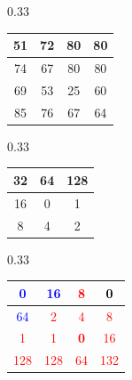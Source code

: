 \begin{subtable}{0.33\textwidth}
    \centering
    \begin{tabular}{|c|c|c|c|}
        \hline
        51 & 72 & 80 & 80 \\ \hline
        74 & 67 & 80 & 80 \\ \hline
        69 & 53 & 25 & 60 \\ \hline
        85 & 76 & 67 & 64 \\ \hline
    \end{tabular}
    \caption{Elevation Surface}\label{tab:ele_surface}
\end{subtable}%
\begin{subtable}{0.33\textwidth}
    \centering
    \begin{tabular}{|c|c|c|}
        \hline
        32 & 64 & 128 \\ \hline
        16 & 0 & 1 \\ \hline
        8 & 4 & 2 \\  \hline
    \end{tabular}
    \vspace{0.3cm}
    \caption{Direction Coding Matrix}\label{tab:direction}
\end{subtable}%
\begin{subtable}{0.33\textwidth}
    \centering
    \begin{tabular}{|c|c|c|c|}
        \hline
        \textcolor{blue}{\textbf{0}} & \textcolor{blue}{16} &     \textcolor{red}{8}      & \textcolor{black}{\textbf{0}} \\ \hline
        \textcolor{blue}{64}     &  \textcolor{red}{2}  &     \textcolor{red}{4}      &      \textcolor{red}{8}       \\ \hline
        \textcolor{red}{1}      &  \textcolor{red}{1}  & \textcolor{red}{\textbf{0}} &      \textcolor{red}{16}      \\ \hline
        \textcolor{red}{128}     & \textcolor{red}{128} &     \textcolor{red}{64}     &     \textcolor{red}{132}      \\ \hline
    \end{tabular}
    \caption{Flow Direction}\label{tab:d8_out}
\end{subtable}